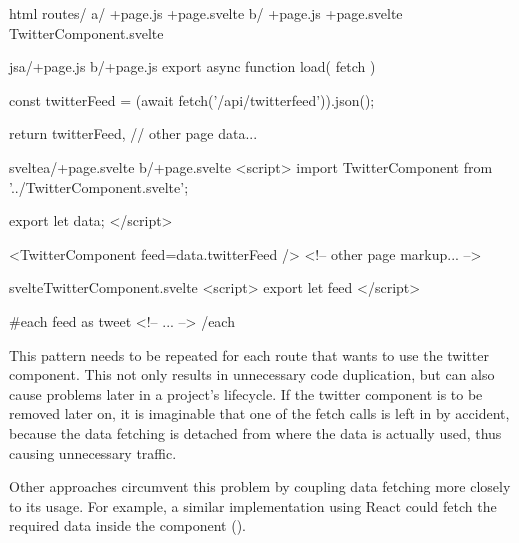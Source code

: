 \begin{listing}[h]
\begin{myminted}{html}{}
routes/
  a/
    +page.js
    +page.svelte
  b/
    +page.js
    +page.svelte
  TwitterComponent.svelte
\end{myminted}
\caption{Directory hierarchy that has a reusable component.}
\label{fig:evaluation-reusable-file-hierarchy}
\end{listing}


\begin{listing}[H]
\begin{myminted}{js}{a/+page.js b/+page.js}
export async function load({ fetch }) {
  const twitterFeed = (await fetch('/api/twitterfeed')).json();

  return {
    twitterFeed,
    // other page data...
  }
}

\end{myminted}
\begin{myminted}{svelte}{a/+page.svelte b/+page.svelte}
<script>
  import TwitterComponent from '../TwitterComponent.svelte';

  export let data;
</script>

<TwitterComponent feed={data.twitterFeed} />
<!-- other page markup... -->
\end{myminted}
\begin{myminted}{svelte}{TwitterComponent.svelte}
<script>
  export let feed
</script>

{#each feed as tweet}
  <!-- ... -->
{/each}
\end{myminted}
\caption{Example Implementation of a reusable component in SvelteKit}
\label{fig:evaluation-reusable-sveltekit}
\end{listing}

This pattern needs to be repeated for each route that wants to use the twitter component. This not only results in unnecessary code duplication, but can also cause problems later in a project's lifecycle. If the twitter component is to be removed later on, it is imaginable that one of the fetch calls is left in by accident, because the data fetching is detached from where the data is actually used, thus causing unnecessary traffic.

Other approaches circumvent this problem by coupling data fetching more closely to its usage. For example, a similar implementation using React could fetch the required data inside the component ().

